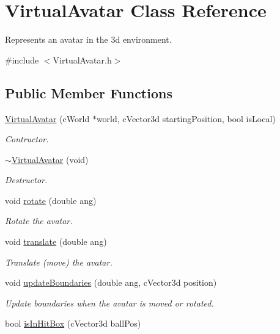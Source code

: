 \hypertarget{classVirtualAvatar}{
\section{VirtualAvatar Class Reference}
\label{classVirtualAvatar}
}


Represents an avatar in the 3d environment.  




{\ttfamily \#include $<$VirtualAvatar.h$>$}

\subsection*{Public Member Functions}
\begin{DoxyCompactItemize}
\item 
\hyperlink{classVirtualAvatar_af35317b6992d361235debb2b05d0ecb9}{VirtualAvatar} (cWorld $\ast$world, cVector3d startingPosition, bool isLocal)
\begin{DoxyCompactList}\small\item\em Contructor. \item\end{DoxyCompactList}\item 
\hypertarget{classVirtualAvatar_a804f465f57b7baf6f10cd92b1ed9a907}{
\hyperlink{classVirtualAvatar_a804f465f57b7baf6f10cd92b1ed9a907}{$\sim$VirtualAvatar} (void)}
\label{classVirtualAvatar_a804f465f57b7baf6f10cd92b1ed9a907}

\begin{DoxyCompactList}\small\item\em Destructor. \item\end{DoxyCompactList}\item 
void \hyperlink{classVirtualAvatar_a7055e90972db0a5e8ad47a2e11a04870}{rotate} (double ang)
\begin{DoxyCompactList}\small\item\em Rotate the avatar. \item\end{DoxyCompactList}\item 
void \hyperlink{classVirtualAvatar_a784e340db30cc9cb6cecb47cedd03c1c}{translate} (double ang)
\begin{DoxyCompactList}\small\item\em Translate (move) the avatar. \item\end{DoxyCompactList}\item 
void \hyperlink{classVirtualAvatar_a8f96410a9875f2f4823a1f5f0d0146f3}{updateBoundaries} (double ang, cVector3d position)
\begin{DoxyCompactList}\small\item\em Update boundaries when the avatar is moved or rotated. \item\end{DoxyCompactList}\item 
\hypertarget{classVirtualAvatar_a76eb4880060cb9af5ac602197186d999}{
bool \hyperlink{classVirtualAvatar_a76eb4880060cb9af5ac602197186d999}{isInHitBox} (cVector3d ballPos)}
\label{classVirtualAvatar_a76eb4880060cb9af5ac602197186d999}


\end{DoxyCompactItemize}
